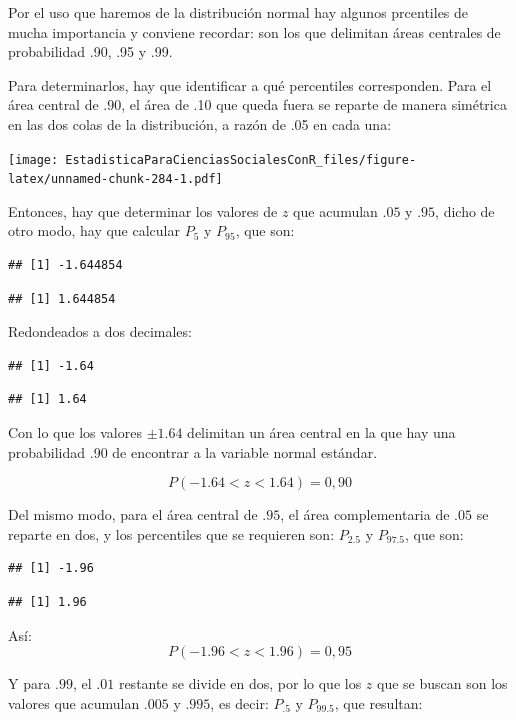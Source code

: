 \documentclass[]{book}
\begin{document}
Por el uso que haremos de la distribución normal hay algunos prcentiles de mucha importancia y conviene recordar: son los que delimitan áreas centrales de probabilidad .90, .95 y .99.

Para determinarlos, hay que identificar a qué percentiles corresponden. Para el área central de .90, el área de .10 que queda fuera se reparte de manera simétrica en las dos colas de la distribución, a razón de .05 en cada una:

\texttt{[image: EstadisticaParaCienciasSocialesConR\_files/figure-latex/unnamed-chunk-284-1.pdf]}

Entonces, hay que determinar los valores de \(z\) que acumulan \(.05\) y \(.95\), dicho de otro modo, hay que calcular \(P_{5}\) y \(P_{95}\), que son:

\begin{verbatim}
## [1] -1.644854
\end{verbatim}

\begin{verbatim}
## [1] 1.644854
\end{verbatim}

Redondeados a dos decimales:

\begin{verbatim}
## [1] -1.64
\end{verbatim}

\begin{verbatim}
## [1] 1.64
\end{verbatim}

Con lo que los valores \(\pm1.64\) delimitan un área central en la que hay una probabilidad .90 de encontrar a la variable normal estándar.

\[P(- 1.64 < z < 1.64) = 0,90\]

Del mismo modo, para el área central de \(.95\), el área complementaria de \(.05\) se reparte en dos, y los percentiles que se requieren son: \(P_{2.5}\) y \(P_{97.5}\), que son:

\begin{verbatim}
## [1] -1.96
\end{verbatim}

\begin{verbatim}
## [1] 1.96
\end{verbatim}

Así:
\[P(- 1.96 < z < 1.96) = 0,95\]

Y para \(.99\), el \(.01\) restante se divide en dos, por lo que los \(z\) que se buscan son los valores que acumulan \(.005\) y \(.995\), es decir: \(P_{.5}\) y \(P_{99.5}\), que resultan:
\end{document}
